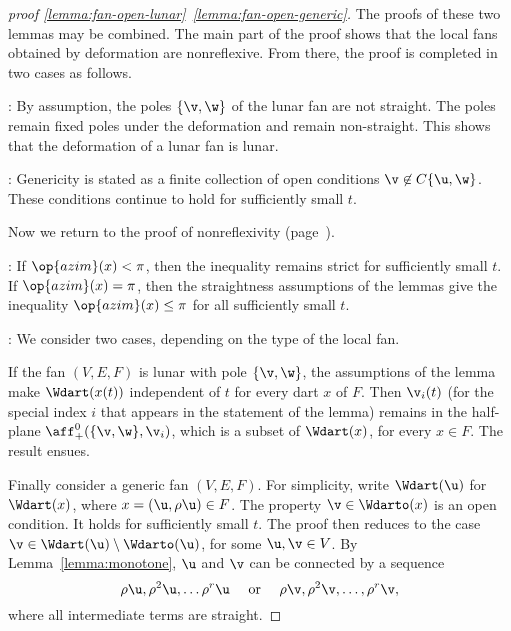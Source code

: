 \begin{proof}[proof \eqref{lemma:fan-open-lunar}~\eqref{lemma:fan-open-generic}] 
  The proofs of these two lemmas may be combined.  The main part of
  the proof shows that the local fans obtained by deformation are
  nonreflexive.  From there, the proof is completed in two cases as
  follows.

  : By assumption, the poles $\{\v,\w\}$ of the lunar fan are not straight.
  The poles
  remain fixed poles under the deformation and remain non-straight.  This
  shows that the deformation of a lunar fan is lunar.

  : Genericity is stated as a finite collection of
open conditions $\v\not\in
  C\{\u,\w\}$.  These conditions continue to hold for sufficiently
  small $t$.

Now we return to the proof of nonreflexivity (page~\pageref{def:convex-local}).

: If $\op{azim}(x)<\pi$, then the inequality remains
strict for sufficiently small $t$.  If $\op{azim}(x)=\pi$, then the
straightness assumptions of the lemmas give the inequality 
$\op{azim}(x)\le\pi$ for all sufficiently small $t$.

: We consider two cases, depending on the type of
the local fan.


If the fan $(V,E,F)$ is lunar with pole $\{\v,\w\}$, the assumptions
of the lemma make $\Wdart(x(t))$ independent of $t$ for every dart $x$
of $F$.  Then $\v_i(t)$ (for the special index $i$ that appears in the
statement of the lemma) remains in the half-plane
$\aff_+^0(\{\v,\w\},\v_i)$, which is a subset of $\Wdart(x)$,
for every $x\in F$.  The result ensues.

Finally consider a generic fan $(V,E,F)$.  For simplicity, write
$\Wdart(\u)$ for $\Wdart(x)$, where $x=(\u,\rho\u)\in F$.  The
property $\v\in \Wdarto(x)$ is an open condition.  It holds for
sufficiently small $t$.  The proof then reduces to the case
$\v\in \Wdart(\u)\setminus \Wdarto(\u)$, for some $\u,\v\in V$.  By
Lemma~\ref{lemma:monotone}, $\u$ and $\v$ can be connected by a
sequence
\[
\rho\u, \rho^2\u,\ldots \rho^r\u\quad\text{ or }\quad 
\rho\v, \rho^2\v,\ldots,\rho^r\v,
\]
where all intermediate terms are straight.


\end{proof}
